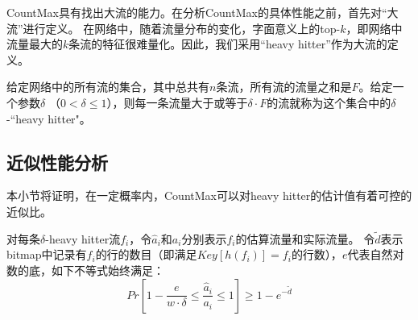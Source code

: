 CountMax具有找出大流的能力。在分析CountMax的具体性能之前，首先对“大流”进行定义。
在网络中，随着流量分布的变化，字面意义上的top-$k$，即网络中流量最大的$k$条流的特征很难量化。因此，我们采用“heavy hitter”作为大流的定义。

给定网络中的所有流的集合，其中总共有$n$条流，所有流的流量之和是$F$。给定一个参数$\delta$ （$0<\delta \le 1$），则每一条流量大于或等于$\delta\cdot F$的流就称为这个集合中的$\delta$-``heavy hitter"。

\subsection{近似性能分析}
本小节将证明，在一定概率内，CountMax可以对heavy hitter的估计值有着可控的近似比。

\begin{theorem}
	\label{tm:query}
    对每条$\delta$-heavy hitter流$f_i$，令$\hat{a}_i$和$a_i$分别表示$f_i$的估算流量和实际流量。
    令$\tilde{d}$表示bitmap中记录有$f_i$的行的数目（即满足$Key[h(f_i)] = f_i$的行数），$e$代表自然对数的底，如下不等式始终满足：
	\begin{equation}
	\label{eq:hhacc}
	Pr[1-\frac{e}{w\cdot \delta}\le \frac{\hat{a}_i}{a_i} \le 1] \ge 1-e^{-\tilde{d}}
	\end{equation}
\end{theorem}

